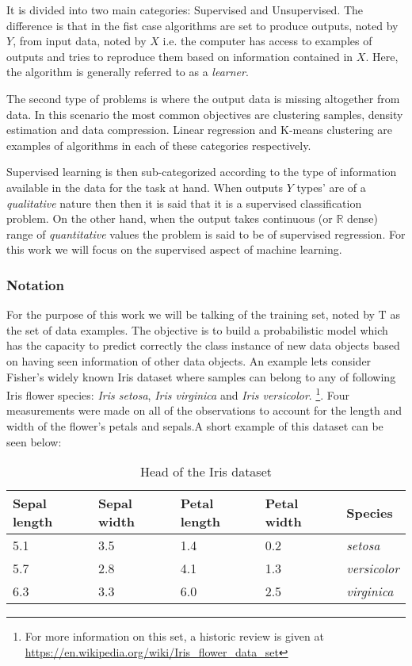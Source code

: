 It is divided into two main categories: Supervised and Unsupervised. The difference is that in the fist case algorithms are set to produce outputs, noted by $Y$, from input data, noted by $X$ i.e. the computer has access to examples of outputs and tries to reproduce them based on information contained in $X$. Here, the algorithm is generally referred to as a \textit{learner}.

The second type of problems is where the output data is missing altogether from data. In this scenario the most common objectives are clustering samples, density estimation and data compression. Linear regression and K-means clustering are examples of algorithms in each of these categories respectively.

Supervised learning is then sub-categorized according to the type of information available in the data for the task at hand. When outputs $Y$ types' are of a \textit{qualitative} nature then then it is said that it is a supervised classification problem. On the other hand, when the output takes continuous (or $\mathbb{R}$ dense) range of \textit{quantitative} values the problem is said to be of supervised regression. For this work we will focus on the supervised aspect of machine learning.

\subsubsection{Notation}

For the purpose of this work we will be talking of the training set, noted by $\mathrm{T}$ as the set of data examples. The objective is to build a probabilistic model which has the capacity to predict correctly the class instance of new data objects based on having seen information of other data objects. An example lets consider Fisher's widely known Iris dataset where samples can belong to any of following Iris flower species: \textit{Iris setosa}, \textit{Iris virginica} and \textit{Iris versicolor}. 
\footnote{For more information on this set, a historic review is given at \url{https://en.wikipedia.org/wiki/Iris_flower_data_set}}.
Four measurements were made on all of the observations to account for the length and width of the flower's petals and sepals.A short example of this dataset can be seen below:

\begin{table}[ht]
\caption{Head of the Iris dataset}
\label{tab:iris_dataset}
\centering
\begin{tabular}{ l l l l l }
\toprule
Sepal length & Sepal width & Petal length & Petal width & Species \\
\midrule
5.1  & 3.5 &  1.4 & 0.2 & \textit{setosa}\\
5.7  & 2.8 &  4.1 & 1.3 & \textit{versicolor} \\
6.3  & 3.3 &  6.0 & 2.5 & \textit{virginica} \\
\bottomrule
\end{tabular}
\end{table}

